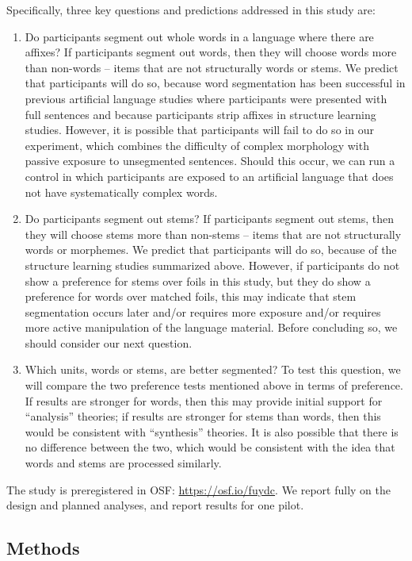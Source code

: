 \documentclass[
  american,
  ,man,floatsintext]{apa6}
\providecommand{\tightlist}{%
  \setlength{\itemsep}{0pt}\setlength{\parskip}{0pt}}
\begin{document}
Specifically, three key questions and predictions addressed in this study are:

\begin{enumerate}
\def\labelenumi{\arabic{enumi}.}
\tightlist
\item
  Do participants segment out whole words in a language where there are affixes? If participants segment out words, then they will choose words more than non-words -- items that are not structurally words or stems. We predict that participants will do so, because word segmentation has been successful in previous artificial language studies where participants were presented with full sentences and because participants strip affixes in structure learning studies. However, it is possible that participants will fail to do so in our experiment, which combines the difficulty of complex morphology with passive exposure to unsegmented sentences. Should this occur, we can run a control in which participants are exposed to an artificial language that does not have systematically complex words.
\item
  Do participants segment out stems? If participants segment out stems, then they will choose stems more than non-stems -- items that are not structurally words or morphemes. We predict that participants will do so, because of the structure learning studies summarized above. However, if participants do not show a preference for stems over foils in this study, but they do show a preference for words over matched foils, this may indicate that stem segmentation occurs later and/or requires more exposure and/or requires more active manipulation of the language material. Before concluding so, we should consider our next question.
\item
  Which units, words or stems, are better segmented? To test this question, we will compare the two preference tests mentioned above in terms of preference. If results are stronger for words, then this may provide initial support for ``analysis'' theories; if results are stronger for stems than words, then this would be consistent with ``synthesis'' theories. It is also possible that there is no difference between the two, which would be consistent with the idea that words and stems are processed similarly.
\end{enumerate}

The study is preregistered in OSF: \url{https://osf.io/fuydc}. We report fully on the design and planned analyses, and report results for one pilot.

\hypertarget{methods}{%
\subsection{Methods}\label{methods}}
\end{document}
